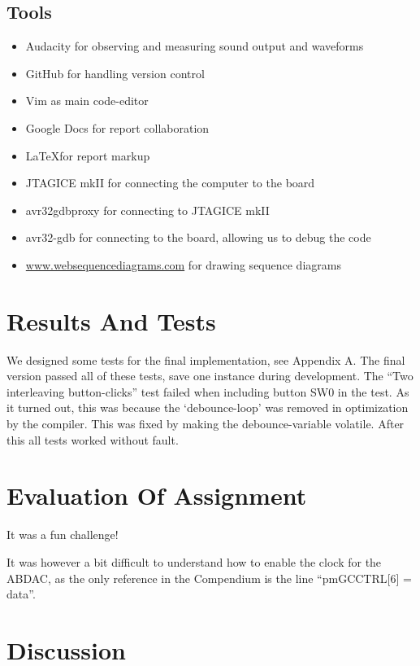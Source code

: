 \documentclass[a4paper,12pt]{article}
\begin{document}
\subsection{Tools}

\begin{itemize}
\item Audacity for observing and measuring sound output and waveforms
\item GitHub for handling version control
\item Vim as main code-editor
\item Google Docs for report collaboration
\item \LaTeX for report markup
\item JTAGICE mkII for connecting the computer to the board
\item avr32gdbproxy for connecting to JTAGICE mkII
\item avr32-gdb for connecting to the board, allowing us to debug the code
\item \url{www.websequencediagrams.com} for drawing sequence diagrams
\end{itemize}

\clearpage
\section{Results And Tests}
We designed some tests for the final implementation, see Appendix A. The final version passed all of these tests, save one instance during development. The  “Two interleaving button-clicks” test failed when including button SW0 in the test. As it turned out, this was because the ‘debounce-loop’ was removed in optimization by the compiler. This was fixed by making the debounce-variable volatile. After this all tests worked without fault.

\clearpage
\section{Evaluation Of Assignment}
It was a fun challenge!

It was however a bit difficult to understand how to enable the clock for the ABDAC, as the only reference in the Compendium \cite{compendium} is the line “pm\rightarrow GCCTRL[6] = data”.

\clearpage
\section{Discussion}
\end{document}
